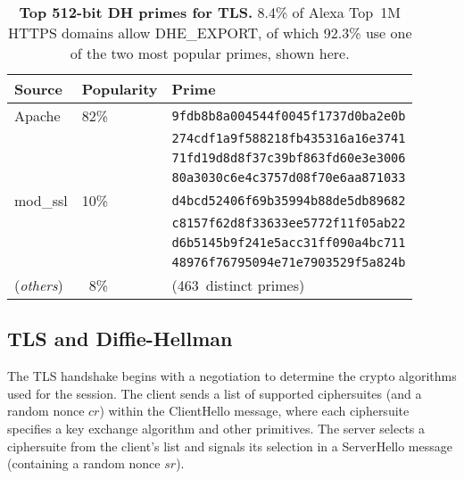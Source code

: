 \def\AData{\texttt{Data}\xspace}
\def\dhe{\textsf{\small DHE}\xspace}
\def\ecdhe{\textsf{\small ECDHE}\xspace}
\def\dheexp{\textsf{\small DHE\_EXPORT}\xspace}

\begin{table}[t]
	\centering\small
	\begin{tabular}{lll}
          \toprule
          Source  & Popularity & Prime \\
          \midrule
          Apache   & 82\% & \tt 9fdb8b8a004544f0045f1737d0ba2e0b\\
                   &      & \tt 274cdf1a9f588218fb435316a16e3741\\
                   &      & \tt 71fd19d8d8f37c39bf863fd60e3e3006\\
                   &      & \tt 80a3030c6e4c3757d08f70e6aa871033\smallskip\\
          mod\_ssl & 10\% & \tt d4bcd52406f69b35994b88de5db89682\\
                   &      & \tt c8157f62d8f33633ee5772f11f05ab22\\
                   &      & \tt d6b5145b9f241e5acc31ff090a4bc711\\
                   &      & \tt 48976f76795094e71e7903529f5a824b\smallskip\\
          (\emph{others\/}) & \ 8\% & (463~distinct primes) \\
          \bottomrule
	\end{tabular}
	\caption{\textbf{Top 512-bit DH primes for TLS\@.}  8.4\% of
      Alexa Top~1M HTTPS domains allow \dheexp{}, of which 92.3\% use
      one of the two most popular primes, shown here.}
    \label{tab:export-primes}
\end{table}

\subsection{TLS and Diffie-Hellman}

The TLS handshake begins with a negotiation to determine the crypto
algorithms used for the session. The client sends a list of supported
ciphersuites (and a random nonce $cr$) within the \textsf{ClientHello}
message, where each ciphersuite specifies a key exchange algorithm and
other primitives.  The server selects a ciphersuite from the client's
list and signals its selection in a \textsf{ServerHello} message
(containing a random nonce $sr$).

